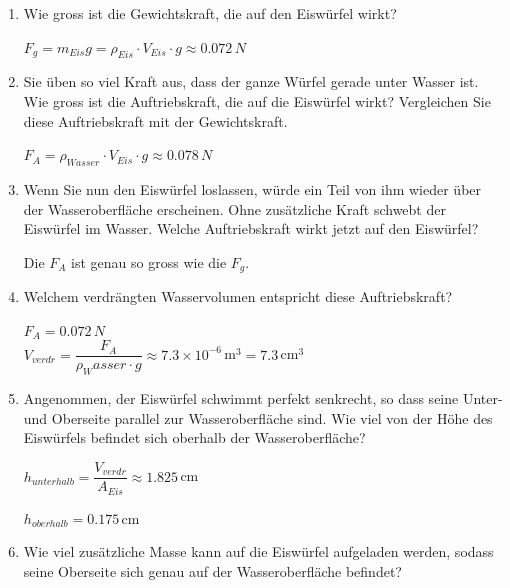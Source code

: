 \documentclass[11pt]{article}
\begin{document}
\begin{enumerate}[label=(\alph*)]
    \vspace{-0.5cm}
    \item Wie gross ist die Gewichtskraft, die auf den Eiswürfel wirkt? 
    
    \color{OliveGreen}
    $F_g = m_{Eis}g = \rho_{Eis} \cdot V_{Eis} \cdot g \approx 0.072\,N$
    \vspace{1cm}
    
    \color{black}
    \item Sie üben so viel Kraft aus, dass der ganze Würfel gerade unter Wasser ist. Wie gross ist die Auftriebskraft, die auf die Eiswürfel wirkt? Vergleichen Sie diese Auftriebskraft mit der Gewichtskraft. 
    
    \color{OliveGreen}
    $F_A = \rho_{Wasser} \cdot V_{Eis} \cdot g \approx 0.078\,N$
    \color{black}
    \vspace{0.5cm}
    
    \item Wenn Sie nun den Eiswürfel loslassen, würde ein Teil von ihm wieder über der Wasseroberfläche erscheinen. Ohne zusätzliche Kraft schwebt der Eiswürfel im Wasser. Welche Auftriebskraft wirkt jetzt auf den Eiswürfel? 
    
    \color{OliveGreen}
    Die $F_A$ ist genau so gross wie die $F_g$.
    \color{black}
    \vspace{0.5cm}

    \item Welchem verdrängten Wasservolumen entspricht diese Auftriebskraft? 
    
    \color{OliveGreen}
    $F_A = 0.072\,N$ \\ \vspace{0.5cm}
    $V_{verdr} = \dfrac{F_A}{\rho_Wasser \cdot g} \approx 7.3\times 10^{-6}\,$m$^3 = 7.3\,$cm$^3$
    \color{black}


    \item Angenommen, der Eiswürfel schwimmt perfekt senkrecht, so dass seine Unter- und Oberseite parallel zur Wasseroberfläche sind. Wie viel von der Höhe des Eiswürfels befindet sich oberhalb der Wasseroberfläche?
    
    \color{OliveGreen}
    $h_{unterhalb} = \dfrac{V_{verdr}}{A_{Eis}} \approx 1.825\,$cm

    $h_{oberhalb} = 0.175\,$cm

    \color{black}
    
    \item Wie viel zusätzliche Masse kann auf die Eiswürfel aufgeladen werden, sodass seine Oberseite sich genau auf der Wasseroberfläche befindet? 


\end{enumerate}
\end{document}
